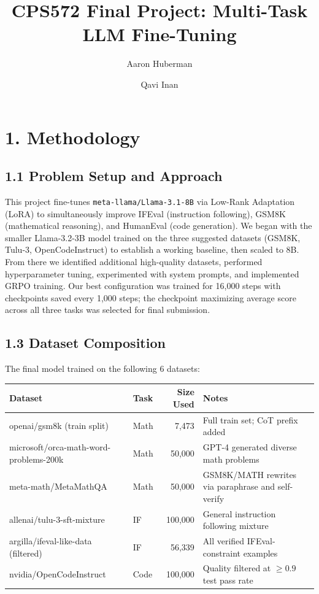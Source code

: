 \documentclass[10pt,letterpaper]{article}
\title{\textbf{CPS572 Final Project: Multi-Task LLM Fine-Tuning}}
\author{Aaron Huberman \and Qavi Inan}
\date{}
\begin{document}
\maketitle
\vspace{-24pt}

\section{1. Methodology}

\subsection{1.1 Problem Setup and Approach}
\vspace{5pt}
This project fine-tunes \texttt{meta-llama/Llama-3.1-8B} via Low-Rank Adaptation (LoRA) 
to simultaneously improve IFEval (instruction following), GSM8K (mathematical reasoning), 
and HumanEval (code generation). We began with the smaller Llama-3.2-3B model trained on 
the three suggested datasets (GSM8K, Tulu-3, OpenCodeInstruct) to establish a working 
baseline, then scaled to 8B. From there we identified additional high-quality datasets, 
performed hyperparameter tuning, experimented with system prompts, and implemented GRPO 
training. Our best configuration was trained for 16,000 steps with checkpoints saved every 
1,000 steps; the checkpoint maximizing average score across all three tasks was selected 
for final submission.

\subsection{1.3 Dataset Composition}

The final model trained on the following 6 datasets:
\begin{table}[H]
\centering
\footnotesize
\begin{tabularx}{\textwidth}{llrX}
\toprule
\textbf{Dataset} & \textbf{Task} & \textbf{Size Used} & \textbf{Notes} \\
\midrule
openai/gsm8k (train split) & Math & 7,473 & Full train set; CoT prefix added \\
microsoft/orca-math-word-problems-200k & Math & 50,000 & GPT-4 generated diverse math problems \\
meta-math/MetaMathQA & Math & 50,000 & GSM8K/MATH rewrites via paraphrase and self-verify \\
allenai/tulu-3-sft-mixture & IF & 100,000 & General instruction following mixture \\
argilla/ifeval-like-data (filtered) & IF & 56,339 & All verified IFEval-constraint examples \\
nvidia/OpenCodeInstruct & Code & 100,000 & Quality filtered at $\geq 0.9$ test pass rate \\
\bottomrule
\end{tabularx}
\end{table}
\end{document}
